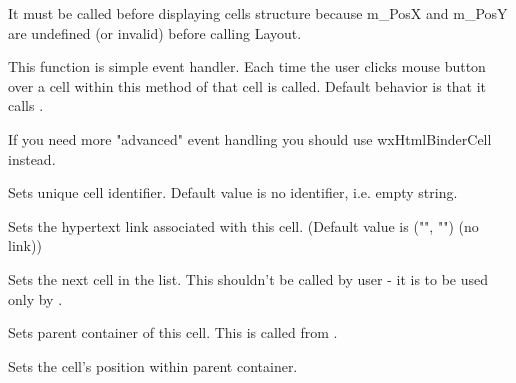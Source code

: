 It must be called before displaying cells structure because
m\_PosX and m\_PosY are undefined (or invalid)
before calling Layout.

\label{wxhtmlcellonmouseclick}


This function is simple event handler. Each time the user clicks mouse button over a cell
within  this method of that cell is called. Default behavior is
that it calls .


If you need more "advanced" event handling
you should use wxHtmlBinderCell instead.





\label{wxhtmlcellsetid}


Sets unique cell identifier. Default value is no identifier, i.e. empty string.

\label{wxhtmlcellsetlink}


Sets the hypertext link associated with this cell. (Default value
is ("", "") (no link))

\label{wxhtmlcellsetnext}


Sets the next cell in the list. This shouldn't be called by user - it is
to be used only by .

\label{wxhtmlcellsetparent}


Sets parent container of this cell. This is called from
.

\label{wxhtmlcellsetpos}


Sets the cell's position within parent container.

